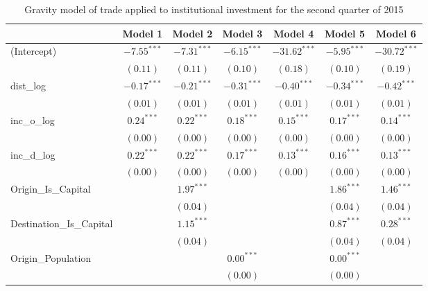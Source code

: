 \begin{table}
	\begin{center}
		\small
		\caption[Gravity Model of Trade for Q2 2015]{Gravity model of trade applied to institutional investment for the second quarter of 2015}
		\begin{tabular}{l c c c c c c }
			\hline
			& Model 1 & Model 2 & Model 3 & Model 4 & Model 5 & Model 6 \\
			\hline
			(Intercept)                  & $-7.55^{***}$ & $-7.31^{***}$ & $-6.15^{***}$ & $-31.62^{***}$ & $-5.95^{***}$ & $-30.72^{***}$ \\
			& $(0.11)$      & $(0.11)$      & $(0.10)$      & $(0.18)$       & $(0.10)$      & $(0.19)$       \\
			dist\_log                    & $-0.17^{***}$ & $-0.21^{***}$ & $-0.31^{***}$ & $-0.40^{***}$  & $-0.34^{***}$ & $-0.42^{***}$  \\
			& $(0.01)$      & $(0.01)$      & $(0.01)$      & $(0.01)$       & $(0.01)$      & $(0.01)$       \\
			inc\_o\_log                  & $0.24^{***}$  & $0.22^{***}$  & $0.18^{***}$  & $0.15^{***}$   & $0.17^{***}$  & $0.14^{***}$   \\
			& $(0.00)$      & $(0.00)$      & $(0.00)$      & $(0.00)$       & $(0.00)$      & $(0.00)$       \\
			inc\_d\_log                  & $0.22^{***}$  & $0.22^{***}$  & $0.17^{***}$  & $0.13^{***}$   & $0.16^{***}$  & $0.13^{***}$   \\
			& $(0.00)$      & $(0.00)$      & $(0.00)$      & $(0.00)$       & $(0.00)$      & $(0.00)$       \\
			Origin\_Is\_Capital          &               & $1.97^{***}$  &               &                & $1.86^{***}$  & $1.46^{***}$   \\
			&               & $(0.04)$      &               &                & $(0.04)$      & $(0.04)$       \\
			Destination\_Is\_Capital     &               & $1.15^{***}$  &               &                & $0.87^{***}$  & $0.28^{***}$   \\
			&               & $(0.04)$      &               &                & $(0.04)$      & $(0.04)$       \\
			Origin\_Population           &               &               & $0.00^{***}$  &                & $0.00^{***}$  &                \\
			&               &               & $(0.00)$      &                & $(0.00)$      &                \\

\end{tabular}
\end{center}
\end{table}
